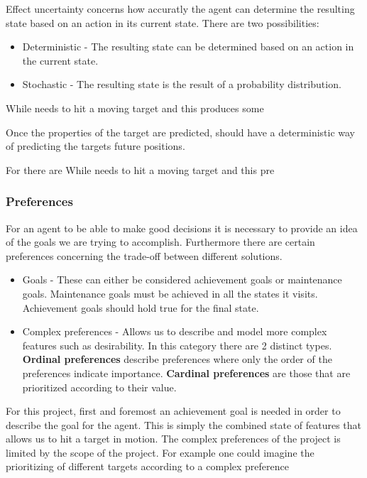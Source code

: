 Effect uncertainty concerns how accuratly the agent can determine the resulting
state based on an action in its current state. There are two possibilities:
\begin{itemize}
  \item Deterministic - The resulting state can be determined based on an action
  in the current state.
  \item Stochastic - The resulting state is the result of a probability
  distribution.
\end{itemize}

While \name needs to hit a moving target and this produces some



Once the properties of the target are predicted, \name should have a
deterministic way of predicting the targets future positions.

For \name there are
While \name needs to hit a moving target and this pre 
 
\subsubsection{Preferences}
For an agent to be able to make good decisions it is necessary to provide an
idea of the goals we are trying to accomplish. Furthermore there are certain
preferences concerning the trade-off between different solutions.

\begin{itemize}
  \item Goals - These can either be considered achievement goals or
  maintenance goals. Maintenance goals must be achieved in all the states
  it visits. Achievement goals should hold true for the final state.
  \item Complex preferences - Allows us to describe and model more complex
  features such as desirability. In this category there are 2 distinct types.
  \textbf{Ordinal preferences} describe preferences where only the order of the
  preferences indicate importance. \textbf{Cardinal preferences} are those that
  are prioritized according to their value.
\end{itemize}

For this project, first and foremost an achievement goal is needed in order to
describe the goal for the agent. This is simply the combined state of features
that allows us to hit a target in motion. The complex preferences of the
project is limited by the scope of the project. For example one could imagine
the prioritizing of different targets according to a complex preference

